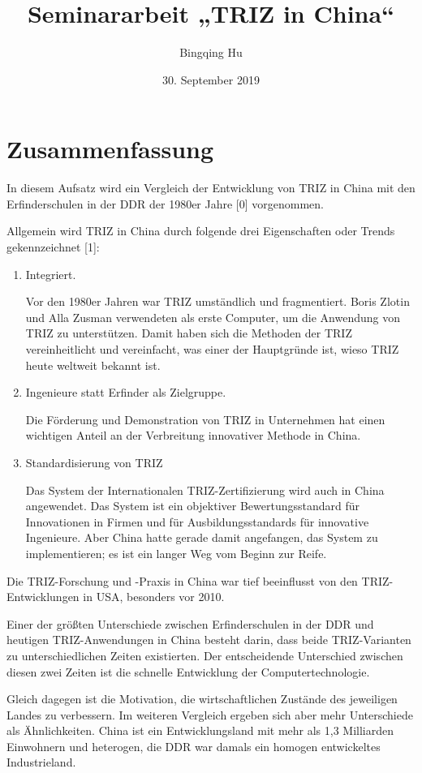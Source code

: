 \documentclass[11pt,a4paper]{article}
\title{Seminararbeit „TRIZ in China“}
\author{Bingqing Hu}
\date{30. September 2019}
\begin{document}
\maketitle
\tableofcontents

\section*{Zusammenfassung}
In diesem Aufsatz wird ein Vergleich der Entwicklung von TRIZ in China mit
den Erfinderschulen in der DDR der 1980er Jahre [0] vorgenommen. 

Allgemein wird TRIZ in China durch folgende drei Eigenschaften oder Trends
gekennzeichnet [1]:
\begin{enumerate}
\item Integriert.
  
Vor den 1980er Jahren war TRIZ umständlich und fragmentiert. Boris Zlotin und
Alla Zusman verwendeten als erste Computer, um die Anwendung von TRIZ zu
unterstützen.  Damit haben sich die Methoden der TRIZ vereinheitlicht und
vereinfacht, was einer der Hauptgründe ist, wieso TRIZ heute weltweit bekannt
ist.
\item Ingenieure statt Erfinder als Zielgruppe.
  
Die Förderung und Demonstration von TRIZ in Unternehmen hat einen wichtigen
Anteil an der Verbreitung innovativer Methode in China.
\item Standardisierung von TRIZ
  
Das System der Internationalen TRIZ-Zertifizierung wird auch in China
angewendet. Das System ist ein objektiver Bewertungsstandard für Innovationen
in Firmen und für Ausbildungsstandards für innovative Ingenieure. Aber China
hatte gerade damit angefangen, das System zu implementieren; es ist ein langer
Weg vom Beginn zur Reife.
\end{enumerate}

Die TRIZ-Forschung und -Praxis in China war tief beeinflusst von den
TRIZ-Entwicklungen in USA, besonders vor 2010.

Einer der größten Unterschiede zwischen Erfinderschulen in der DDR und
heutigen TRIZ-Anwendungen in China besteht darin, dass beide TRIZ-Varianten zu
unterschiedlichen Zeiten existierten.  Der entscheidende Unterschied zwischen
diesen zwei Zeiten ist die schnelle Entwicklung der Computertechnologie.

Gleich dagegen ist die Motivation, die wirtschaftlichen Zustände des
jeweiligen Landes zu verbessern.  Im weiteren Vergleich ergeben sich aber mehr
Unterschiede als Ähnlichkeiten. China ist ein Entwicklungsland mit mehr als
1,3 Milliarden Einwohnern und heterogen, die DDR war damals ein homogen
entwickeltes Industrieland.
\end{document}

